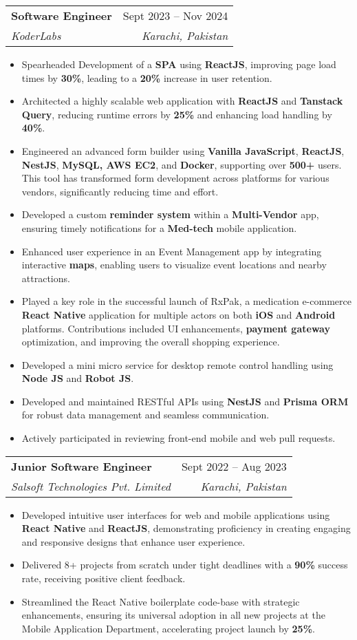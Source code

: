 \documentclass[letterpaper,11pt]{article}
\makeatletter
\newcommand{\resumeItem}[1]{
  \item\small{
    {#1 \vspace{-2pt}}
  }
}
\newcommand{\resumeSubheading}[4]{
  \vspace{-2pt}\item
    \begin{tabular*}{0.97\textwidth}[t]{l@{\extracolsep{\fill}}r}
      \textbf{#1} & #2 \\
      \textit{\small#3} & \textit{\small #4} \\
    \end{tabular*}\vspace{-7pt}
}
\newcommand{\resumeSubSubheading}[2]{
    \item
    \begin{tabular*}{0.97\textwidth}{l@{\extracolsep{\fill}}r}
      \textit{\small#1} & \textit{\small #2} \\
    \end{tabular*}\vspace{-7pt}
}
\newcommand{\resumeSubHeadingListEnd}{\end{itemize}}
\newcommand{\resumeItemListStart}{\begin{itemize}}
\newcommand{\resumeItemListEnd}{\end{itemize}\vspace{-5pt}}
\makeatother
\begin{document}
    \resumeSubheading
      {Software Engineer}{Sept 2023 -- Nov 2024}
      {KoderLabs}{Karachi, Pakistan}
      \resumeItemListStart
        \resumeItem{Spearheaded Development of a \textbf{SPA} using \textbf{ReactJS}, improving page load times by \textbf{30\%}, leading to a \textbf{20\%} increase in user retention.}
        \resumeItem{Architected a highly scalable web application with \textbf{ReactJS} and \textbf{Tanstack Query}, reducing runtime errors by \textbf{25\%} and enhancing load handling by \textbf{40\%}.}
        \resumeItem{Engineered an advanced form builder using \textbf{Vanilla JavaScript}, \textbf{ReactJS}, \textbf{NestJS}, \textbf{MySQL, AWS EC2}, and \textbf{Docker}, supporting over \textbf{500+} users. This tool has transformed form development across platforms for various vendors, significantly reducing time and effort.}
\resumeItem{Developed a custom \textbf{reminder system} within a \textbf{Multi-Vendor} app, ensuring timely notifications for a \textbf{Med-tech} mobile application.}
\resumeItem{Enhanced user experience in an Event Management app by integrating interactive \textbf{maps}, enabling users to visualize event locations and nearby attractions.}
\resumeItem{Played a key role in the successful launch of RxPak, a medication e-commerce \textbf{React Native }application for multiple actors on both \textbf{iOS }and \textbf{Android }platforms. Contributions included UI enhancements, \textbf{payment gateway }optimization, and improving the overall shopping experience.}
\resumeItem{Developed a mini micro service for desktop remote control handling using \textbf{Node JS} and \textbf{Robot JS}.}
\resumeItem{Developed and maintained RESTful APIs using \textbf{NestJS} and \textbf{Prisma ORM} for robust data management and seamless communication.}
\resumeItem{Actively participated in reviewing front-end mobile and web pull requests.}
      \resumeItemListEnd
      

    \resumeSubheading
      {Junior Software Engineer }{Sept 2022 -- Aug 2023}
      {Salsoft Technologies Pvt. Limited}{Karachi, Pakistan}
      \resumeItemListStart
              \resumeItem{Developed intuitive user interfaces for web and mobile applications using \textbf{React Native} and \textbf{ReactJS}, demonstrating
proficiency in creating engaging and responsive designs that enhance user experience.}
        \resumeItem{Delivered 8+ projects from scratch under tight deadlines with a \textbf{90\%} success rate, receiving positive client feedback.}
        \resumeItem{Streamlined the React Native boilerplate code-base with strategic enhancements, ensuring its universal adoption in all new projects at the Mobile Application Department, accelerating project launch by \textbf{25\%}.}
    \resumeItemListEnd
\end{document}
